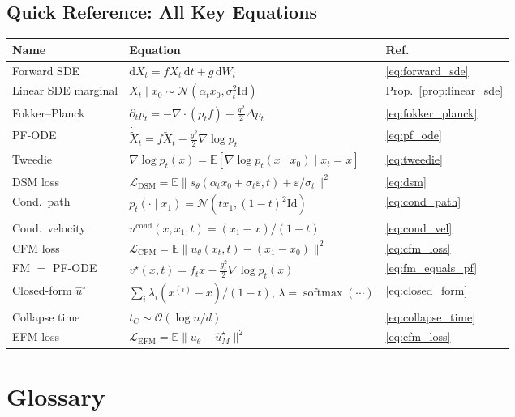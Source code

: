 \documentclass[11pt, a4paper]{article}
\newcommand{\E}{\mathbb{E}}
\newcommand{\Id}{\mathrm{Id}}
\newcommand{\dd}{\mathrm{d}}
\newcommand{\grad}{\nabla}
\newcommand{\divg}{\nabla \cdot}
\newcommand{\softmax}{\operatorname{softmax}}
\theoremstyle{plain}
\theoremstyle{definition}
\theoremstyle{remark}
\begin{document}
\subsection{Quick Reference: All Key Equations}

{\small
\renewcommand{\arraystretch}{1.4}
\begin{tabularx}{\textwidth}{lXl}
\toprule
\textbf{Name} & \textbf{Equation} & \textbf{Ref.} \\
\midrule
Forward SDE & $\dd X_t = f X_t\,\dd t + g\,\dd W_t$ & \eqref{eq:forward_sde} \\
Linear SDE marginal & $X_t\mid x_0 \sim \mathcal{N}(\alpha_t x_0, \sigma_t^2\Id)$ & Prop.~\ref{prop:linear_sde} \\
Fokker--Planck & $\partial_t p_t = -\divg(p_t f) + \frac{g^2}{2}\Delta p_t$ & \eqref{eq:fokker_planck} \\
PF-ODE & $\dot{\tilde{X}}_t = f\tilde{X}_t - \frac{g^2}{2}\grad\log p_t$ & \eqref{eq:pf_ode} \\
Tweedie & $\grad\log p_t(x) = \E[\grad\log p_t(x\mid x_0)\mid x_t=x]$ & \eqref{eq:tweedie} \\
DSM loss & $\mathcal{L}_\mathrm{DSM} = \E\|s_\theta(\alpha_t x_0+\sigma_t\varepsilon,t)+\varepsilon/\sigma_t\|^2$ & \eqref{eq:dsm} \\
Cond.\ path & $p_t(\cdot\mid x_1) = \mathcal{N}(tx_1,(1-t)^2\Id)$ & \eqref{eq:cond_path} \\
Cond.\ velocity & $u^{\mathrm{cond}}(x,x_1,t) = (x_1-x)/(1-t)$ & \eqref{eq:cond_vel} \\
CFM loss & $\mathcal{L}_\mathrm{CFM} = \E\|u_\theta(x_t,t)-(x_1-x_0)\|^2$ & \eqref{eq:cfm_loss} \\
FM $=$ PF-ODE & $v^\star(x,t) = f_t x - \frac{g_t^2}{2}\grad\log p_t(x)$ & \eqref{eq:fm_equals_pf} \\
Closed-form $\hat{u}^\star$ & $\sum_i\lambda_i(x^{(i)}-x)/(1-t)$, $\lambda=\softmax(\cdots)$ & \eqref{eq:closed_form} \\
Collapse time & $t_C \sim \mathcal{O}(\log n/d)$ & \eqref{eq:collapse_time} \\
EFM loss & $\mathcal{L}_\mathrm{EFM} = \E\|u_\theta - \hat{u}^\star_M\|^2$ & \eqref{eq:efm_loss} \\
\bottomrule
\end{tabularx}
}

\section{Glossary}
\end{document}
